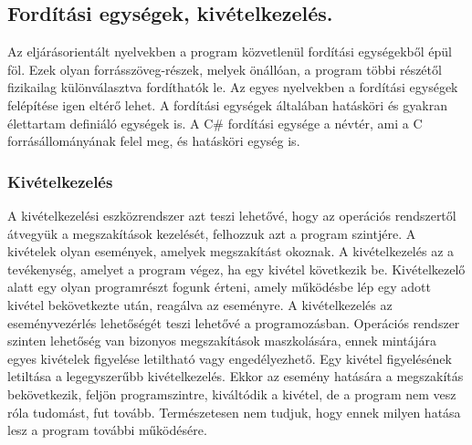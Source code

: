 \subsection{Fordítási egységek, kivételkezelés.}
Az eljárásorientált nyelvekben a program közvetlenül fordítási egységekből épül föl. Ezek olyan forrásszöveg-részek, melyek önállóan, a program többi részétől fizikailag különválasztva fordíthatók le. Az egyes nyelvekben a fordítási egységek felépítése igen eltérő lehet. A fordítási egységek általában hatásköri és gyakran élettartam definiáló egységek is. A C\# fordítási egysége a névtér, ami a C forrásállományának felel meg, és hatásköri egység is.

\subsubsection{Kivételkezelés}
A kivételkezelési eszközrendszer azt teszi lehetővé, hogy az operációs rendszertől átvegyük a megszakítások kezelését, felhozzuk azt a program szintjére. A kivételek olyan események, amelyek megszakítást okoznak. A kivételkezelés az a tevékenység, amelyet a program végez, ha egy kivétel következik be. Kivételkezelő alatt egy olyan programrészt fogunk érteni, amely működésbe lép egy adott kivétel bekövetkezte után, reagálva az eseményre. A kivételkezelés az eseményvezérlés lehetőségét teszi lehetővé a programozásban. Operációs rendszer szinten lehetőség van bizonyos megszakítások maszkolására, ennek mintájára egyes kivételek figyelése letiltható vagy engedélyezhető. Egy kivétel figyelésének letiltása a legegyszerűbb kivételkezelés. Ekkor az esemény hatására a megszakítás bekövetkezik, feljön programszintre, kiváltódik a kivétel, de a program nem vesz róla tudomást, fut tovább. Természetesen nem tudjuk, hogy ennek milyen hatása lesz a program további működésére.

